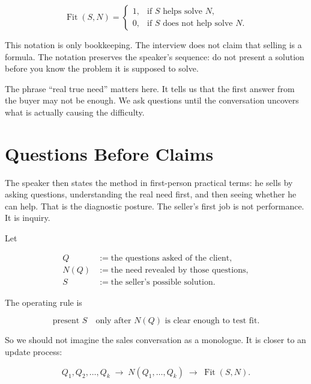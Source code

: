 \begin{equation}
\operatorname{Fit}(S,N)=
\begin{cases}
1, & \text{if } S \text{ helps solve } N,\\
0, & \text{if } S \text{ does not help solve } N.
\end{cases}
\end{equation}

\begin{remark}
This notation is only bookkeeping. The interview does not claim that selling is a formula. The notation preserves the speaker's sequence: do not present a solution before you know the problem it is supposed to solve.
\end{remark}

The phrase ``real true need'' matters here. It tells us that the first answer from the buyer may not be enough. We ask questions until the conversation uncovers what is actually causing the difficulty.

\section{Questions Before Claims}

The speaker then states the method in first-person practical terms: he sells by asking questions, understanding the real need first, and then seeing whether he can help. That is the diagnostic posture. The seller's first job is not performance. It is inquiry.

Let

\begin{align}
Q &:= \text{the questions asked of the client},\\
N(Q) &:= \text{the need revealed by those questions},\\
S &:= \text{the seller's possible solution}.
\end{align}

The operating rule is

\begin{equation}
\text{present } S
\quad
\text{only after } N(Q) \text{ is clear enough to test fit}.
\end{equation}

So we should not imagine the sales conversation as a monologue. It is closer to an update process:

\begin{equation}
Q_1,Q_2,\ldots,Q_k
\;\longrightarrow\;
N(Q_1,\ldots,Q_k)
\;\longrightarrow\;
\operatorname{Fit}(S,N).
\end{equation}

